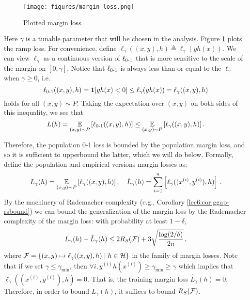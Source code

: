 \begin{figure}[ht!]
    \begin{center}
  \texttt{[image: figures/margin\_loss.png]}
  \end{center}
  \caption{Plotted margin loss.}
  \label{lec6:fig:marginloss}
\end{figure}
Here $\gamma$ is a tunable parameter that will be chosen in the analysis. Figure \ref{lec6:fig:marginloss} plots the ramp loss. For convenience, define $\ell_\gamma((x,y), h) \triangleq \ell_\gamma(yh(x))$. We can view $\ell_\gamma$ as a continuous version of $\ell_{\textup{0-1}}$ that is more sensitive to the scale of the margin on $[0,\gamma]$. Notice that $\ell_{\textup{0-1}}$ is always less than or equal to the $\ell_\gamma$ when $\gamma\geq 0$, i.e.
\begin{equation}
    \ell_{\textup{0-1}}((x,y), h) = \mathbf{1}[yh(x) < 0]\leq \ell_\gamma(yh(x)) =\ell_\gamma ((x,y), h)
\end{equation}
holds for all $(x,y)\sim P$. Taking the expectation over $(x,y)$ on both sides of this inequality, we see that
\begin{equation}
    L(h) = \operatorname*{\mathbb{E}}_{(x,y)\sim P} \left[ \ell_{\textup{0-1}}((x,y), h) \right] \leq \operatorname*{\mathbb{E}}_{(x,y)\sim P} \left[ \ell_\gamma ((x,y), h) \right].
\end{equation}

Therefore, the population 0-1 loss is bounded by the population margin loss, and so it is sufficient to upperbound the latter, which we will do below. 
Formally, define the population and empirical versions margin losses as:
\begin{equation}
L_\gamma(h) = \operatorname*{\mathbb{E}}_{(x,y)\sim P}\left[ \ell_\gamma((x,y), h)\right], \quad \hat{L}_\gamma(h) = \sum_{i=1}^n\left [\ell_\gamma((x^{(i)},y^{(i)}), h)\right]\,.
\end{equation}
By the machinery of Rademacher complexity (e.g., Corollary \ref{lec6:cor:ggap-rsbound}) we can bound the generalization of the margin loss by the Rademacher complexity of the margin loss: with probability at least $1-\delta$, 
\begin{equation}
L_\gamma(h) - \hat{L}_\gamma(h)\leq 2R_S(\mathcal F) + 3\sqrt{\frac{\log (2/\delta)}{2n}}\,,
\end{equation}
where $\mathcal F = \{(x,y)\mapsto \ell_\gamma((x,y), h)\mid h\in\mathcal H\}$ in the family of margin losses. Note that if we set $\gamma\leq \gamma_{\min}$, then $\forall i, y^{(i)}h(x^{(i)})\geq \gamma_{\min}\ge \gamma$ which implies that $\ell_\gamma((x^{(i)}, y^{(i)}), h)=0$. That is, the training margin loss $\hat{L}_{\gamma}(h) = 0$. 
Therefore, in order to bound $L_\gamma(h)$, it suffices to bound $R_S(\mathcal F)$.

